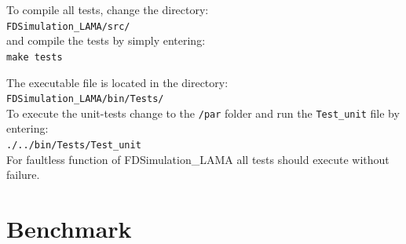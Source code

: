\documentclass[pdftex,a4paper,parskip,listof=totoc,bibliography=totoc,onehalfspacing,12pt]{scrreprt}
\newcommand{\shellcmd}[1]{\indent\indent\texttt{#1}}	%
\newcommand{\shellcmdline}[1]{\indent\indent\texttt{\quad#1}} 	%
\begin{document}
To compile all tests, change the directory: \\\shellcmdline{FDSimulation\_LAMA/src/} \\ and compile the tests by simply entering:\\\shellcmdline{make tests}

The executable file is located in the directory:
\\\shellcmdline{FDSimulation\_LAMA/bin/Tests/}\\
To execute the unit-tests change to the \shellcmd{/par} folder and run the \shellcmd{Test\_unit} file by entering:
\\\shellcmdline{./../bin/Tests/Test\_unit}\\ 
For faultless function of FDSimulation\_LAMA all tests should execute without failure.

\section{Benchmark}

\cleardoublepage
{}
\listoffigures
{}
\listoftables
{}
\cleardoublepage


\end{document}

